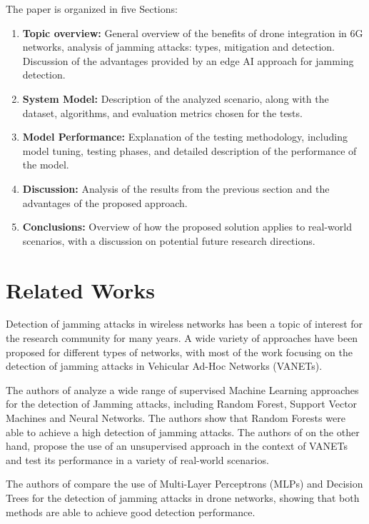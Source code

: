 \documentclass[futureinternet,article,submit,pdftex,moreauthors]{Definitions/mdpi}
\begin{document}
The paper is organized in five Sections: 
\begin{enumerate}
	\item \textbf{Topic overview:} General overview of the benefits of drone integration in 6G networks, analysis of jamming attacks: types, mitigation and detection. Discussion of the advantages provided by an edge AI approach for jamming detection. 
	\item \textbf{System Model:} Description of the analyzed scenario, along with the dataset, algorithms, and evaluation metrics chosen for the tests.
	\item \textbf{Model Performance:} Explanation of the testing methodology, including model tuning, testing phases, and detailed description of the performance of the model.
	\item \textbf{Discussion:} Analysis of the results from the previous section and the advantages of the proposed approach.
	\item \textbf{Conclusions:} Overview of how the proposed solution applies to real-world scenarios, with a discussion on potential future research directions.
\end{enumerate}

\section{Related Works}

Detection of jamming attacks in wireless networks has been a topic of interest for the research community for many years. A wide variety of approaches have been proposed for different types of networks, with most of the work focusing on the detection of jamming attacks in Vehicular Ad-Hoc Networks (VANETs)\cite{VANETsAI-Lyamin}.

The authors of \cite{JammingDetectionML-Arjoune} analyze a wide range of supervised Machine Learning approaches for the detection of Jamming attacks, including Random Forest, Support Vector Machines and Neural Networks. The authors show that Random Forests were able to achieve a high detection of jamming attacks. 
The authors of \cite{JammingDetectionRF-Karagiannis} on the other hand, propose the use of an unsupervised approach in the context of VANETs and test its performance in a variety of real-world scenarios. 

The authors of \cite{JammingDetectionDrones-Greco} compare the use of Multi-Layer Perceptrons (MLPs) and Decision Trees for the detection of jamming attacks in drone networks, showing that both methods are able to achieve good detection performance. 
\end{document}
